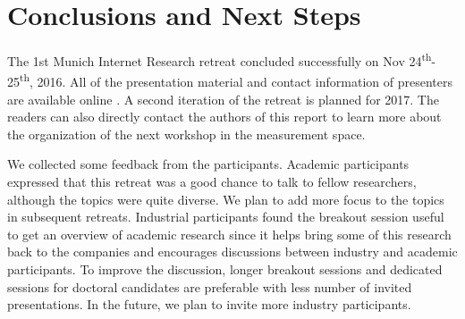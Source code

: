 \section{Conclusions and Next Steps}\label{sec:conclusion}

The 1st Munich Internet Research retreat concluded successfully on Nov
24\textsuperscript{th}-25\textsuperscript{th}, 2016. All of the presentation
material and contact information of presenters are available online
\cite{mir-materials}. A second iteration of the retreat is planned for 2017.
The readers can also directly contact the authors of this report to learn more
about the organization of the next workshop in the measurement space.

We collected some feedback from the participants. Academic participants
expressed that this retreat was a good chance to talk to fellow researchers,
although the topics were quite diverse. We plan to add more focus to the
topics in subsequent retreats. Industrial participants found the breakout
session useful to get an overview of academic research since it helps bring
some of this research back to the companies and encourages discussions between
industry and academic participants. To improve the discussion, longer breakout
sessions and dedicated sessions for doctoral candidates are preferable with
less number of invited presentations. In the future, we plan to invite more
industry participants.






